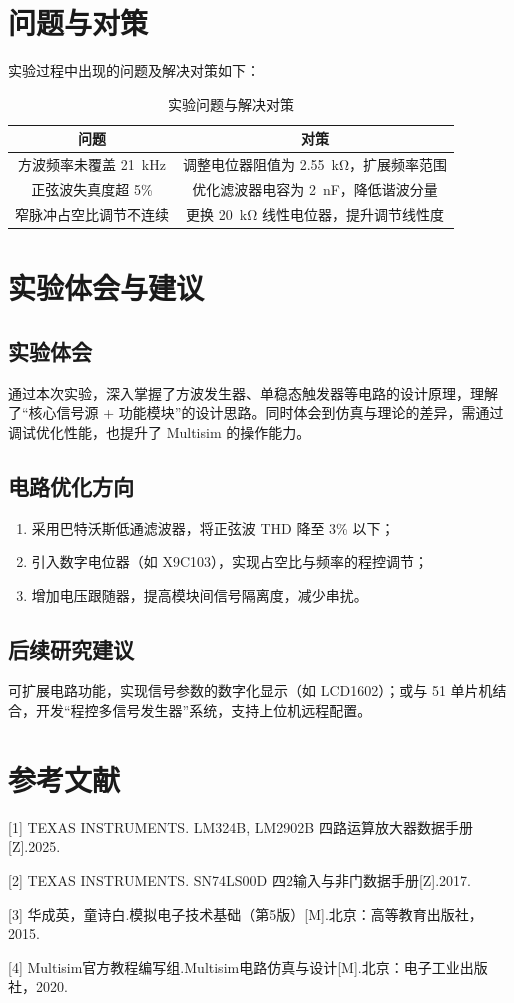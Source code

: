 \documentclass[twoside]{article}
\begin{document}
\section{问题与对策}
实验过程中出现的问题及解决对策如下：
\begin{table}[H]
    \centering
    \small
    \begin{tabular}{c c}
        \toprule
        \textbf{问题} & \textbf{对策} \\
        \midrule
        方波频率未覆盖 \SI{21}{\kilo\hertz} & 调整电位器阻值为 \SI{2.55}{\kilo\ohm}，扩展频率范围 \\
        \midrule
        正弦波失真度超 5\% & 优化滤波器电容为 \SI{2}{\nano\farad}，降低谐波分量 \\
        \midrule
        窄脉冲占空比调节不连续 & 更换 \SI{20}{\kilo\ohm} 线性电位器，提升调节线性度 \\
        \bottomrule
    \end{tabular}
    \caption{实验问题与解决对策}
    \label{tab:problems-solutions}
\end{table}

\section{实验体会与建议}

\subsection{实验体会}
通过本次实验，深入掌握了方波发生器、单稳态触发器等电路的设计原理，理解了“核心信号源 + 功能模块”的设计思路。同时体会到仿真与理论的差异，需通过调试优化性能，也提升了 Multisim 的操作能力。
\label{sec:experience}

\subsection{电路优化方向}
\begin{enumerate}[label=\arabic*., leftmargin=2em, itemsep=0.3em]
    \item 采用巴特沃斯低通滤波器，将正弦波 THD 降至 3\% 以下；
    \item 引入数字电位器（如 X9C103），实现占空比与频率的程控调节；
    \item 增加电压跟随器，提高模块间信号隔离度，减少串扰。
\end{enumerate}
\label{sec:optimization}

\subsection{后续研究建议}
可扩展电路功能，实现信号参数的数字化显示（如 LCD1602）；或与 51 单片机结合，开发“程控多信号发生器”系统，支持上位机远程配置。
\label{sec:future-research}

\section{参考文献}
[1] TEXAS INSTRUMENTS. LM324B, LM2902B 四路运算放大器数据手册[Z].2025.

[2] TEXAS INSTRUMENTS. SN74LS00D 四2输入与非门数据手册[Z].2017.

[3] 华成英，童诗白.模拟电子技术基础（第5版）[M].北京：高等教育出版社，2015.

[4] Multisim官方教程编写组.Multisim电路仿真与设计[M].北京：电子工业出版社，2020.
\label{sec:references}
\end{document}
